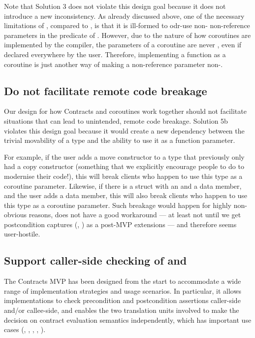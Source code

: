 Note that Solution 3 does not violate this design goal because it does not introduce a new inconsistency. As already discussed above, one of the necessary limitations of , compared to , is that it is ill-formed to odr-use non- non-reference parameters in the predicate of . However, due to the nature of how coroutines are implemented by the compiler, the parameters of a coroutine are never , even if declared  everywhere by the user. Therefore, implementing a function as a coroutine is just another way of making a non-reference parameter non-.

\subsection{Do not facilitate remote code breakage}

Our design for how Contracts and coroutines work together should not facilitate situations that can lead to unintended, remote code breakage. Solution 5b violates this design goal because it would create a new dependency between the trivial movability of a type and the ability to use it as a function parameter.

For example, if the user adds a move constructor to a type that previously only had a copy constructor (something that we explicitly encourage people to do to modernise their code!), this will break clients who happen to use this type as a coroutine parameter. Likewise, if there is a struct with an  and a  data member, and the user adds a  data member, this will also break clients who happen to use this type as a coroutine parameter. Such breakage would happen for highly non-obvious reasons, does not have a good workaround --- at least not until we get postcondition captures (\cite{P2461R1}, \cite{P3098R0}) as a post-MVP extensions --- and therefore seems user-hostile.

\subsection{Support caller-side checking of  and }

The Contracts MVP has been designed from the start to accommodate a wide range of implementation strategies and usage scenarios. In particular, it allows implementations to check precondition and postcondition assertions caller-side and/or callee-side, and enables the two translation units involved to make the decision on contract evaluation semantics independently, which has important use cases (\cite{P2751R1}, \cite{P3228R1}, \cite{P3119R1}, \cite{P3267R1}, \cite{P3321R0}).

